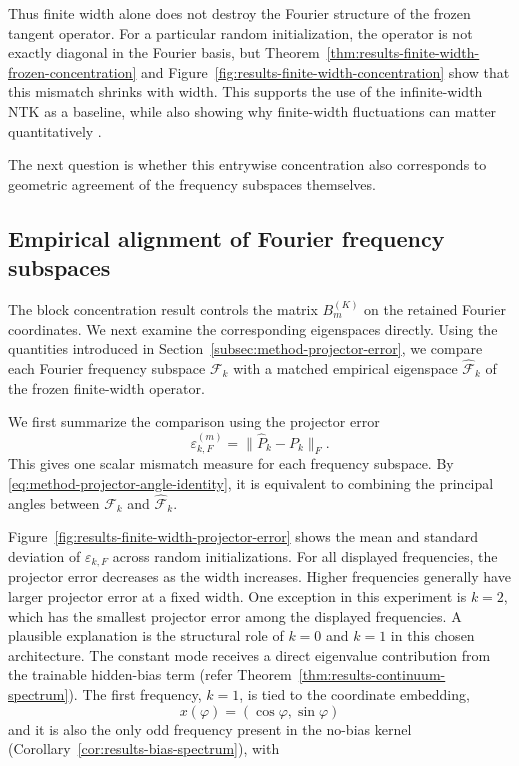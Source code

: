Thus finite width alone does not destroy the Fourier structure of the frozen
tangent operator. For a particular random initialization, the operator is not
exactly diagonal in the Fourier basis, but
Theorem~\ref{thm:results-finite-width-frozen-concentration} and
Figure~\ref{fig:results-finite-width-concentration} show that this mismatch
shrinks with width. This supports the use of the infinite-width NTK as a
baseline, while also showing why finite-width fluctuations can matter
quantitatively
\citep{jacot2018ntk,lee2020wide,bordelon2023dynamicsfinitewidthkernel,
	vyas2022limitationsntkunderstandinggeneralization}.

The next question is whether this entrywise concentration also corresponds to
geometric agreement of the frequency subspaces themselves.

\subsection{Empirical alignment of Fourier frequency subspaces}
\label{subsec:results-finite-width-subspace-alignment}

The block concentration result controls the matrix \(B_m^{(K)}\) on the retained
Fourier coordinates. We next examine the corresponding eigenspaces directly.
Using the quantities introduced in
Section~\ref{subsec:method-projector-error}, we compare each Fourier frequency
subspace \(\mathcal F_k\) with a matched empirical eigenspace
\(\widehat{\mathcal F}_k\) of the frozen finite-width operator.

We first summarize the comparison using the projector error
\[
	\varepsilon_{k,F}^{(m)}
	=
	\|\widehat P_k-P_k\|_F .
\]
This gives one scalar mismatch measure for each frequency subspace. By
\eqref{eq:method-projector-angle-identity}, it is equivalent to combining the
principal angles between \(\mathcal F_k\) and \(\widehat{\mathcal F}_k\).

Figure~\ref{fig:results-finite-width-projector-error} shows the mean and
standard deviation of \(\varepsilon_{k,F}\) across random initializations.
For all displayed frequencies, the projector error decreases as the width
increases. Higher frequencies generally have larger projector error at a fixed
width. One exception in this experiment is \(k=2\), which has the smallest
projector error among the displayed frequencies.
A plausible explanation is the structural role of
\(k=0\) and \(k=1\) in this chosen architecture.
The constant mode receives a direct eigenvalue contribution from the trainable
hidden-bias term (refer Theorem~\ref{thm:results-continuum-spectrum}).
The first frequency, \(k=1\), is tied to the coordinate embedding,
\[
	x(\varphi)=(\cos\varphi,\sin\varphi)
\]
and it is also the only odd frequency
present in the no-bias kernel (Corollary~\ref{cor:results-bias-spectrum}), with

